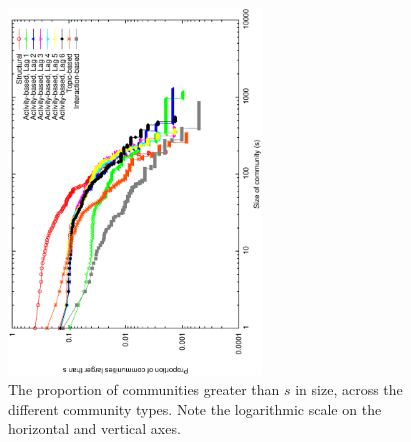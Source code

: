 \begin{figure}[ht]
  \centering
\includegraphics[width=0.6\textwidth,angle=270]{cdf_comm_sizes.eps}
\caption{The proportion of communities greater than $s$ in size, across the different community types. Note the logarithmic scale on the horizontal and vertical axes.}
\label{Fig-community_size_distribution}
\end{figure}




